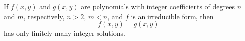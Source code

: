 \begin{proposition}
    If $f(x,y)$ and $g(x,y)$ are polynomials with integer coefficients of degrees $n$ and $m$, respectively, $n>2$, $m<n$, and $f$ is an irreducible form, then
\[
    f(x,y)=g(x,y)
\]
    has only finitely many integer solutions.
\end{proposition}

